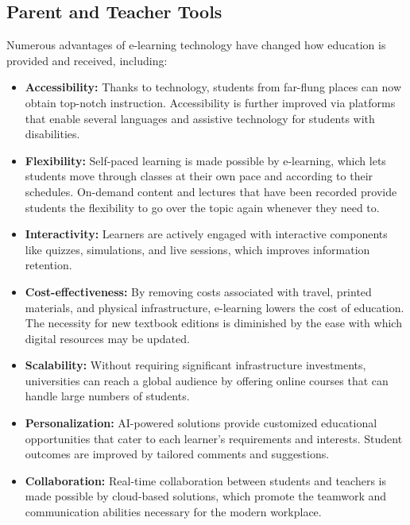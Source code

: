 \documentclass[BTech]{audiss}
\begin{document}
\subsection{Parent and Teacher Tools}
Numerous advantages of e-learning technology have changed how education is provided and received, including:

\begin{itemize}
    \item \textbf{Accessibility:} Thanks to technology, students from far-flung places can now obtain top-notch instruction. Accessibility is further improved via platforms that enable several languages and assistive technology for students with disabilities.
    
    \item \textbf{Flexibility:} Self-paced learning is made possible by e-learning, which lets students move through classes at their own pace and according to their schedules. On-demand content and lectures that have been recorded provide students the flexibility to go over the topic again whenever they need to.
    
    \item \textbf{Interactivity:} Learners are actively engaged with interactive components like quizzes, simulations, and live sessions, which improves information retention.
    
    \item \textbf{Cost-effectiveness:} By removing costs associated with travel, printed materials, and physical infrastructure, e-learning lowers the cost of education. The necessity for new textbook editions is diminished by the ease with which digital resources may be updated.
    
    \item \textbf{Scalability:} Without requiring significant infrastructure investments, universities can reach a global audience by offering online courses that can handle large numbers of students.
    
    \item \textbf{Personalization:} AI-powered solutions provide customized educational opportunities that cater to each learner's requirements and interests. Student outcomes are improved by tailored comments and suggestions.
    
    \item \textbf{Collaboration:} Real-time collaboration between students and teachers is made possible by cloud-based solutions, which promote the teamwork and communication abilities necessary for the modern workplace.
\end{itemize}
\end{document}
